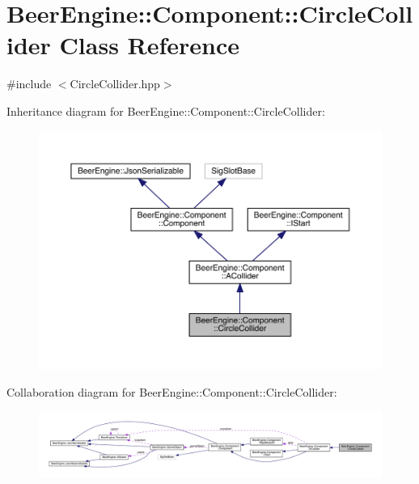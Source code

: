 \hypertarget{class_beer_engine_1_1_component_1_1_circle_collider}{}\section{Beer\+Engine\+:\+:Component\+:\+:Circle\+Collider Class Reference}
\label{class_beer_engine_1_1_component_1_1_circle_collider}


{\ttfamily \#include $<$Circle\+Collider.\+hpp$>$}



Inheritance diagram for Beer\+Engine\+:\+:Component\+:\+:Circle\+Collider\+:
\nopagebreak
\begin{figure}[H]
\begin{center}
\leavevmode
\includegraphics[width=350pt]{class_beer_engine_1_1_component_1_1_circle_collider__inherit__graph}
\end{center}
\end{figure}


Collaboration diagram for Beer\+Engine\+:\+:Component\+:\+:Circle\+Collider\+:
\nopagebreak
\begin{figure}[H]
\begin{center}
\leavevmode
\includegraphics[width=350pt]{class_beer_engine_1_1_component_1_1_circle_collider__coll__graph}
\end{center}
\end{figure}
